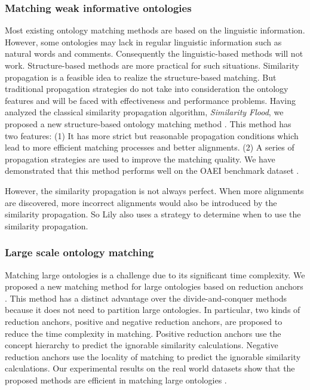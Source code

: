 \documentclass{llncs}
\begin{document}
\subsubsection{Matching weak informative ontologies} Most existing ontology matching methods are based on the linguistic information. However, some ontologies may lack in regular linguistic information such as natural words and comments. Consequently the linguistic-based methods will not work. Structure-based methods are more practical for such situations. Similarity propagation is a feasible idea to realize the structure-based matching. But traditional propagation strategies do not take into consideration the ontology features and will be faced with effectiveness and performance problems. Having analyzed the classical similarity propagation algorithm, \textit{Similarity Flood}, we proposed a new structure-based ontology matching method \cite{simprop}. This method has two features: (1) It has more strict but reasonable propagation conditions which lead to more efficient matching processes and better alignments. (2) A series of propagation strategies are used to improve the matching quality. We have demonstrated that this method performs well on the OAEI benchmark dataset \cite{simprop}. \par
However, the similarity propagation is not always perfect. When more alignments are discovered, more incorrect alignments would also be introduced by the similarity propagation. So Lily also uses a strategy to determine when to use the similarity propagation. \par
\subsubsection{Large scale ontology matching} Matching large ontologies is a challenge due to its significant time complexity. We proposed a new matching method for large ontologies based on reduction anchors \cite{lom_redanc}. This method has a distinct advantage over the divide-and-conquer methods because it does not need to partition large ontologies. In particular, two kinds of reduction anchors, positive and negative reduction anchors, are proposed to reduce the time complexity in matching. Positive reduction anchors use the concept hierarchy to predict the ignorable similarity calculations. Negative reduction anchors use the locality of matching to predict the ignorable similarity calculations. Our experimental results on the real world datasets show that the proposed methods are efficient in matching large ontologies \cite{lom_redanc}. \par
\end{document}

